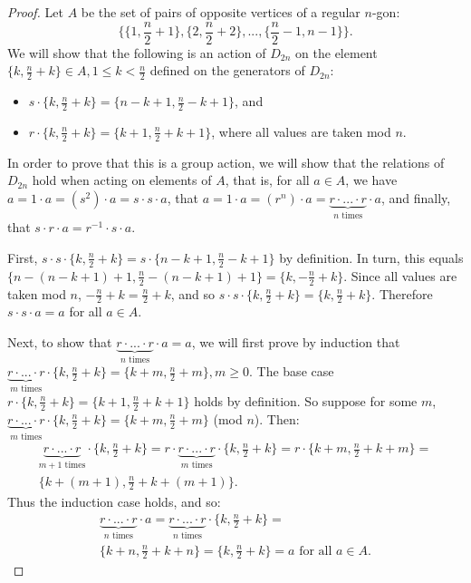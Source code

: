 \documentclass{article}
\begin{document}
\begin{proof}
  Let $A$ be the set of pairs of opposite vertices of a regular $n$-gon:
  \begin{equation*}
    \bigl\{ \{1,\frac{n}{2} + 1\}, \{2, \frac{n}{2} + 2\}, ..., \{\frac{n}{2} - 1, n - 1\} \bigr\}.
  \end{equation*}
  We will show that the following is an action of $D_{2n}$ on the element $\{k, \frac{n}{2} + k\} \in A, 1 \leq k < \frac{n}{2}$ defined on the generators of $D_{2n}$: 
  \begin{itemize}
    \item $s \cdot \{ k, \frac{n}{2} + k \} = \{ n - k + 1, \frac{n}{2} - k + 1 \}$, and
    \item $r \cdot \{ k, \frac{n}{2} + k \} = \{ k + 1, \frac{n}{2} + k + 1 \}$, where all values are taken mod $n$.
  \end{itemize}

  In order to prove that this is a group action, we will show that the relations of $D_{2n}$ hold when acting on elements of $A$, that is, for all $a \in A$, we have $a = 1 \cdot a = (s^2) \cdot a = s \cdot s \cdot a$, that $a = 1 \cdot a = (r^n) \cdot a = \underbrace{r \cdot ... \cdot r}_\text{$n$ times} \cdot a$, and finally, that $s \cdot r \cdot a = r^{-1} \cdot s \cdot a$.

  First, $s \cdot s \cdot \{ k, \frac{n}{2} + k \} = s \cdot \{ n - k + 1, \frac{n}{2} - k + 1 \}$ by definition. In turn, this equals $\{ n - (n - k + 1) + 1, \frac{n}{2} - (n - k + 1) + 1 \} = \{ k, -\frac{n}{2} + k \}$. Since all values are taken mod $n$, $-\frac{n}{2} + k = \frac{n}{2} + k$, and so $s \cdot s \cdot \{ k, \frac{n}{2} + k \} = \{ k, \frac{n}{2} + k \}$. Therefore $s \cdot s \cdot a = a$ for all $a \in A$.

  Next, to show that $\underbrace{r \cdot ... \cdot r}_\text{$n$ times} \cdot a = a$, we will first prove by induction that $\underbrace{r \cdot ... \cdot r}_\text{$m$ times} \cdot \{ k, \frac{n}{2} + k \} = \{ k + m, \frac{n}{2} + m \}, m \geq 0$. The base case $r \cdot \{ k, \frac{n}{2} + k \} = \{ k + 1, \frac{n}{2} + k + 1 \}$ holds by definition. So suppose for some $m$, $\underbrace{r \cdot ... \cdot r}_\text{$m$ times} \cdot \{ k, \frac{n}{2} + k \} = \{ k + m, \frac{n}{2} + m \}$ (mod $n$). Then: 
  \begin{multline*}
    \underbrace{r \cdot ... \cdot r}_\text{$m + 1$ times} \cdot \{ k, \frac{n}{2} + k \} = r \cdot \underbrace{r \cdot ... \cdot r}_\text{$m$ times} \cdot \{ k, \frac{n}{2} + k \} = r \cdot \{ k + m, \frac{n}{2} + k + m \} = \\
    \{ k + (m + 1), \frac{n}{2} + k + (m + 1) \}.
  \end{multline*}
  Thus the induction case holds, and so:
  \begin{multline*}
    \underbrace{r \cdot ... \cdot r}_\text{$n$ times} \cdot a = \underbrace{r \cdot ... \cdot r}_\text{$n$ times} \cdot\{ k, \frac{n}{2} + k \} = \\ \{ k + n, \frac{n}{2} + k + n \} = \{ k, \frac{n}{2} + k \} = a \text{ for all } a \in A.
  \end{multline*}


\end{proof}
\end{document}
